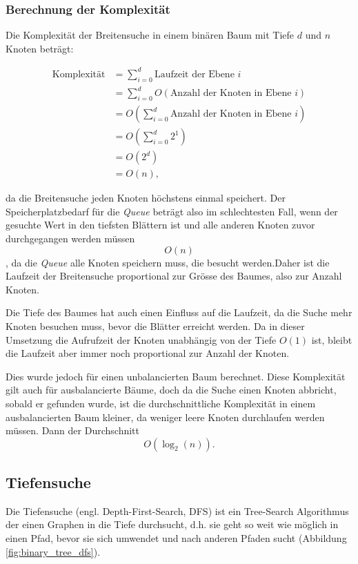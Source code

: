 \documentclass[a4paper,11pt]{article}
\begin{document}
\subsubsection{Berechnung der Komplexität}

Die Komplexität der Breitensuche in einem binären Baum mit Tiefe $d$ und $n$ Knoten beträgt:

\begin{align}
\text{Komplexität} &= \sum_{i=0}^{d} \text{Laufzeit der Ebene } i \\
&= \sum_{i=0}^{d} O(\text{Anzahl der Knoten in Ebene }i) \\
&= O(\sum_{i=0}^{d} \text{Anzahl der Knoten in Ebene }i) \\
&= O(\sum_{i=0}^{d} 2^1) \\
&= O(2^d) \\
&= O(n),
\end{align}

da die Breitensuche jeden Knoten höchstens einmal speichert. Der Speicherplatzbedarf für die \emph{Queue} beträgt also im schlechtesten Fall, wenn der gesuchte Wert in den tiefsten Blättern ist und alle anderen Knoten zuvor durchgegangen werden müssen $$O(n)$$, da die \emph{Queue} alle Knoten speichern muss, die besucht werden.Daher ist die Laufzeit der Breitensuche proportional zur Grösse des Baumes, also zur Anzahl Knoten.

Die Tiefe des Baumes hat auch einen Einfluss auf die Laufzeit, da die Suche mehr Knoten besuchen muss, bevor die Blätter erreicht werden. Da in dieser Umsetzung die Aufrufzeit der Knoten unabhängig von der Tiefe $O(1)$ ist, bleibt die Laufzeit aber immer noch proportional zur Anzahl der Knoten.

Dies wurde jedoch für einen unbalancierten Baum berechnet. Diese Komplexität gilt auch für ausbalancierte Bäume, doch da die Suche einen Knoten abbricht, sobald er gefunden wurde, ist die durchschnittliche Komplexität in einem ausbalancierten Baum kleiner, da weniger leere Knoten durchlaufen werden müssen. Dann der Durchschnitt $$O(\log_2(n)).$$

\subsection{Tiefensuche}

Die Tiefensuche (engl. Depth-First-Search, DFS) ist ein Tree-Search Algorithmus der einen Graphen in die Tiefe durchsucht, d.h. sie geht so weit wie möglich in einen Pfad, bevor sie sich umwendet und nach anderen Pfaden sucht (Abbildung \ref{fig:binary_tree_dfs}).
\end{document}
